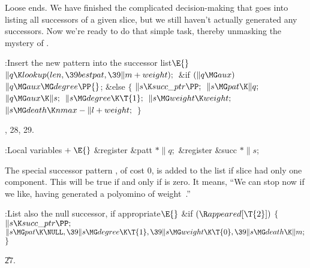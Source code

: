 Loose ends. We have finished the complicated decision-making that goes
into listing all successors of a given slice, but we still haven't
actually generated any successors. Now we're ready to do that simple task,
thereby unmasking the mystery of .

\Y\B\4:Insert the new pattern into the successor list\X${}\E{}$\6
$\|q\K\\{lookup}(\\{len},\39\\{bestpat},\39\|m+\\{weight});{}$\6
\&{if} ${}(\|q\MG\\{aux}){}$\1\5
${}\|q\MG\\{aux}\MG\\{degree}\PP{}$;\2\6
\&{else}\5
${}\{{}$\1\6
${}\|s\K\\{succ\_ptr}\PP;{}$\6
${}\|s\MG\\{pat}\K\|q;{}$\6
${}\|q\MG\\{aux}\K\|s;{}$\6
${}\|s\MG\\{degree}\K\T{1};{}$\6
${}\|s\MG\\{weight}\K\\{weight};{}$\6
${}\|s\MG\\{death}\K\\{nmax}-\|l+\\{weight};{}$\6
\4${}\}{}$\2\par
{}, 28, 29.\fi

\B{}:Local variables\X${}\mathrel+\E{}$\6
\&{register} \&{patt} ${}{*}\|q;{}$\6
\&{register} \&{succ} ${}{*}\|s{}$;\par
\fi

The special successor pattern \PB{$\NULL$}, of cost 0, is added to the
list
if slice  had only one component. This will be true if and only
if  is zero. It means, ``We can stop now if we like,
having
generated a polyomino of weight~.''

\Y\B\4:List also the null successor, if appropriate\X${}\E{}$\6
\&{if} ${}(\R\\{appeared}[\T{2}]){}$\5
${}\{{}$\1\6
${}\|s\K\\{succ\_ptr}\PP;{}$\6
${}\|s\MG\\{pat}\K\NULL,\39\|s\MG\\{degree}\K\T{1},\39\|s\MG\\{weight}\K\T{0},%
\39\|s\MG\\{death}\K\|m;{}$\6
\4${}\}{}$\2\par
\U27.\fi

